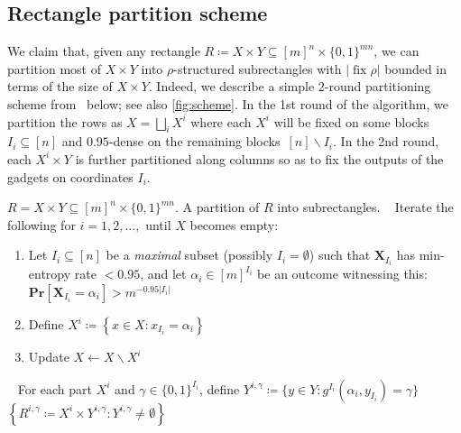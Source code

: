 \documentclass[11pt]{article}
\numberwithin{equation}{section}
\theoremstyle{definition}
\theoremstyle{plain}
\renewcommand{\Pr}{\mathbf{Pr}}
\DeclareMathOperator{\fix}{fix}
\newcommand{\X}{\bm{X}}
\newcommand{\allX}{[m]^n}
\newcommand{\allY}{\{0,1\}^{mn}}
\newcommand{\set}[1]{\left \{ #1 \right \}}
\newcommand{\bit}{\{0,1\}}
\begin{document}
\subsection{Rectangle partition scheme}

We claim that, given any rectangle $R \coloneqq X\times Y\subseteq \allX\times\allY$, we can partition most of $X\times Y$ into $\rho$-structured subrectangles with $|\!\fix\rho|$ bounded in terms of the size of $X\times Y$. Indeed, we describe a simple 2-round partitioning scheme from~\cite{goos17bpp} below; see also \autoref{fig:scheme}. In the 1st round of the algorithm, we partition the rows as $X=\bigsqcup_i X^i$ where each $X^i$ will be fixed on some blocks $I_i\subseteq[n]$ and $0.95$-dense on the remaining blocks~$[n]\smallsetminus I_i$. In the 2nd round, each $X^i\times Y$ is further partitioned along columns so as to fix the outputs of the gadgets on coordinates $I_i$.

\vspace{1mm}

\begin{algorithm}[ht]
	\begin{algorithmic}[1]
		\vspace{1mm}
		\Input $R = X \times Y \subseteq \allX \times \allY$.
		\Output A partition of $R$ into subrectangles.
		\vspace{2mm}
		~ Iterate the following for $i=1,2,\ldots,$ until $X$ becomes empty:
	\begin{enumerate}[label=(\roman*),topsep=1mm]
		\item Let $I_i\subseteq [n]$ be a \emph{maximal} subset (possibly $I_i=\emptyset$) such that $\X_{I_i}$ has min-entropy rate $<0.95$, and let $\alpha_i\in[m]^{I_i}$ be an outcome witnessing this: $\Pr[\X_{I_i}=\alpha_i]>m^{-0.95|I_i|}$
		\item Define $X^i \coloneqq \set{x \in X: x_{I_i}=\alpha_i}$
		\item Update $X \gets X \smallsetminus X^i$
	\end{enumerate}
\vspace{1mm}
~ For each part $X^i$ and $\gamma \in \bit^{I_i}$, define $Y^{i,\gamma} \coloneqq \{ y \in Y : g^{I_i}(\alpha_i,y_{I_i})=\gamma\}$
\vspace{1mm}
\State \Return $\set{R^{i,\gamma} \coloneqq X^i \times Y^{i,\gamma} : Y^{i,\gamma} \ne \emptyset}$
	\end{algorithmic}
	\caption{\vspace{.5mm}}
	\label{alg:partition}
\end{algorithm}
\end{document}
